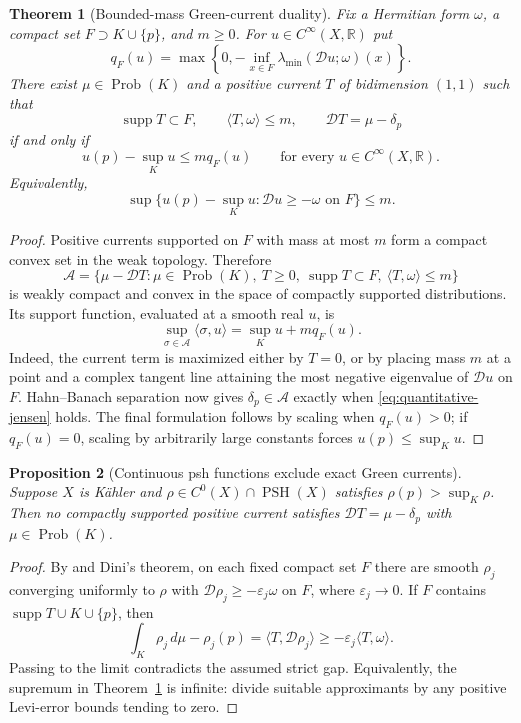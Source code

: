 \documentclass[11pt]{article}
\newtheorem{theorem}{Theorem}[section]
\newtheorem{proposition}[theorem]{Proposition}
\theoremstyle{remark}
\newcommand{\D}{\mathcal D}
\newcommand{\supp}{\operatorname{supp}}
\begin{document}
\begin{theorem}[Bounded-mass Green-current duality]
\label{thm:bounded-mass-duality}
Fix a Hermitian form $\omega$, a compact set $F\supset K\cup\{p\}$,
and $m\ge0$. For $u\in C^\infty(X,\mathbb R)$ put
\[
 q_F(u)=\max\left\{0,-\inf_{x\in F}
              \lambda_{\min}(\D u;\omega)(x)\right\}.
\]
There exist $\mu\in\operatorname{Prob}(K)$ and a positive current $T$
of bidimension $(1,1)$ such that
\[
 \supp T\subset F,\qquad \langle T,\omega\rangle\le m,
 \qquad \D T=\mu-\delta_p
\]
if and only if
\begin{equation}\label{eq:quantitative-jensen}
 u(p)-\sup_Ku\le m q_F(u)
 \qquad\text{for every }u\in C^\infty(X,\mathbb R).
\end{equation}
Equivalently,
\[
 \sup\{u(p)-\sup_Ku:\D u\ge-\omega\text{ on }F\}\le m.
\]
\end{theorem}
\begin{proof}
Positive currents supported on $F$ with mass at most $m$ form a compact
convex set in the weak topology. Therefore
\[
 \mathcal A=\{\mu-\D T:
     \mu\in\operatorname{Prob}(K),\ T\ge0,
     \ \supp T\subset F,\ \langle T,\omega\rangle\le m\}
\]
is weakly compact and convex in the space of compactly supported
distributions. Its support function, evaluated at a smooth real $u$, is
\[
 \sup_{\sigma\in\mathcal A}\langle\sigma,u\rangle
       =\sup_Ku+m q_F(u).
\]
Indeed, the current term is maximized either by $T=0$, or by placing
mass $m$ at a point and a complex tangent line attaining the most
negative eigenvalue of $\D u$ on $F$. Hahn--Banach separation now gives
$\delta_p\in\mathcal A$ exactly when
\eqref{eq:quantitative-jensen} holds. The final formulation follows by
scaling when $q_F(u)>0$; if $q_F(u)=0$, scaling by arbitrarily large
constants forces $u(p)\le\sup_Ku$.
\end{proof}

\begin{proposition}[Continuous psh functions exclude exact Green currents]
\label{prop:continuous-green-exclusion}
Suppose $X$ is K\"ahler and $\rho\in C^0(X)\cap\operatorname{PSH}(X)$
satisfies $\rho(p)>\sup_K\rho$. Then no compactly supported positive
current satisfies $\D T=\mu-\delta_p$ with
$\mu\in\operatorname{Prob}(K)$.
\end{proposition}
\begin{proof}
By \cite[Corollary~9.3]{Demailly82} and Dini's theorem, on each fixed
compact set $F$ there are smooth $\rho_j$ converging uniformly to $\rho$
with $\D\rho_j\ge-\varepsilon_j\omega$ on $F$, where
$\varepsilon_j\to0$. If $F$ contains $\supp T\cup K\cup\{p\}$, then
\[
 \int_K\rho_j\,d\mu-\rho_j(p)
   =\langle T,\D\rho_j\rangle
   \ge-\varepsilon_j\langle T,\omega\rangle.
\]
Passing to the limit contradicts the assumed strict gap. Equivalently,
the supremum in Theorem~\ref{thm:bounded-mass-duality} is infinite:
divide suitable approximants by any positive Levi-error bounds tending
to zero.
\end{proof}
\end{document}
